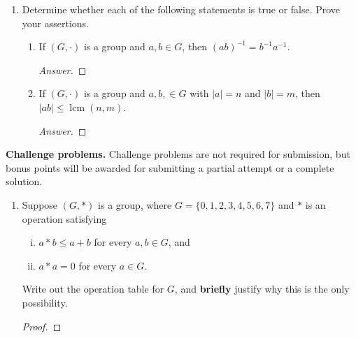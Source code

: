 \documentclass{article}
\theoremstyle{definition}
\numberwithin{equation}{section}
\renewcommand\>{\rangle}
\newcommand\<{\langle}
\newcommand\0{\mathbf{0}}
\DeclareMathOperator\lcm{lcm} %
\begin{document}
\begin{enumerate}[(H1)]
\begin{proof}
\end{proof}


\item 
Determine whether each of the following statements is true or false.  Prove your assertions.  

\begin{enumerate}
\item 
If $(G, \cdot)$ is a group and $a, b \in G$, then $(ab)^{-1} = b^{-1}a^{-1}$.  

\begin{proof}[Answer]

\end{proof}


\item 
If $(G, \cdot)$ is a group and $a, b, \in G$ with $|a| = n$ and $|b| = m$, then $|ab| \le \lcm(n,m)$.  

\begin{proof}[Answer]

\end{proof}

\end{enumerate}

\end{enumerate}



\bigskip
\noindent
\textbf{Challenge problems.}
Challenge problems are not required for submission, but bonus points will be awarded for submitting a partial attempt or a complete solution.  

\begin{enumerate}[(C1)]
\item 
Suppose $(G, *)$ is a group, where $G = \{0, 1, 2, 3, 4, 5, 6, 7\}$ and $*$ is an operation satisfying
\begin{enumerate}[(i)]
\item 
$a * b \le a + b$ for every $a, b \in G$, and

\item 
$a * a = 0$ for every $a \in G$.  

\end{enumerate}

Write out the operation table for $G$, and \textbf{briefly} justify why this is the only possibility.  

\begin{proof}

\end{proof}

\end{enumerate}
\end{document}
